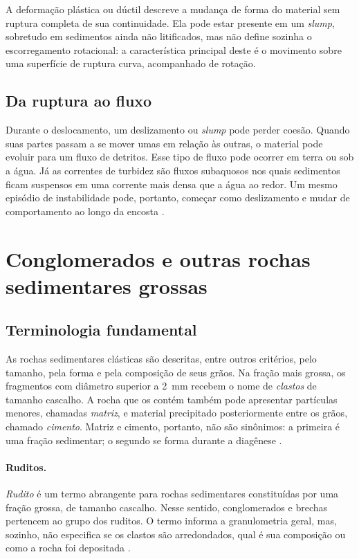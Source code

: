 \documentclass[a4paper,12pt]{article}
\theoremstyle{definition}
\theoremstyle{definition}
\theoremstyle{definition}
\begin{document}
A deformação plástica ou dúctil descreve a mudança de forma do
material sem ruptura completa de sua continuidade. Ela pode estar
presente em um \textit{slump}, sobretudo em sedimentos ainda não
litificados, mas não define sozinha o escorregamento rotacional:
a característica principal deste é o movimento sobre uma superfície
de ruptura curva, acompanhado de rotação.

\subsection{Da ruptura ao fluxo}

Durante o deslocamento, um deslizamento ou \textit{slump} pode perder
coesão. Quando suas partes passam a se mover umas em relação às
outras, o material pode evoluir para um fluxo de detritos. Esse tipo
de fluxo pode ocorrer em terra ou sob a água. Já as correntes de
turbidez são fluxos subaquosos nos quais sedimentos ficam suspensos
em uma corrente mais densa que a água ao redor. Um mesmo episódio de
instabilidade pode, portanto, começar como deslizamento e mudar de
comportamento ao longo da encosta
\autocite{hampton1996submarine,iverson2003gravity}.

\section{Conglomerados e outras rochas sedimentares grossas}

\subsection{Terminologia fundamental}

As rochas sedimentares clásticas são descritas, entre outros critérios,
pelo tamanho, pela forma e pela composição de seus grãos. Na fração
mais grossa, os fragmentos com diâmetro superior a \SI{2}{\milli\metre}
recebem o nome de \emph{clastos} de tamanho cascalho. A rocha que os
contém também pode apresentar partículas menores, chamadas
\emph{matriz}, e material precipitado posteriormente entre os grãos,
chamado \emph{cimento}. Matriz e cimento, portanto, não são
sinônimos: a primeira é uma fração sedimentar; o segundo se forma
durante a diagênese \autocite{mit2007siliciclastic,uspconglomerado}.

\paragraph{Ruditos.}
\emph{Rudito} é um termo abrangente para rochas sedimentares
constituídas por uma fração grossa, de tamanho cascalho. Nesse
sentido, conglomerados e brechas pertencem ao grupo dos ruditos.
O termo informa a granulometria geral, mas, sozinho, não especifica
se os clastos são arredondados, qual é sua composição ou como a
rocha foi depositada \autocite{folk1970detrital,kgsclassificacao}.
\end{document}
